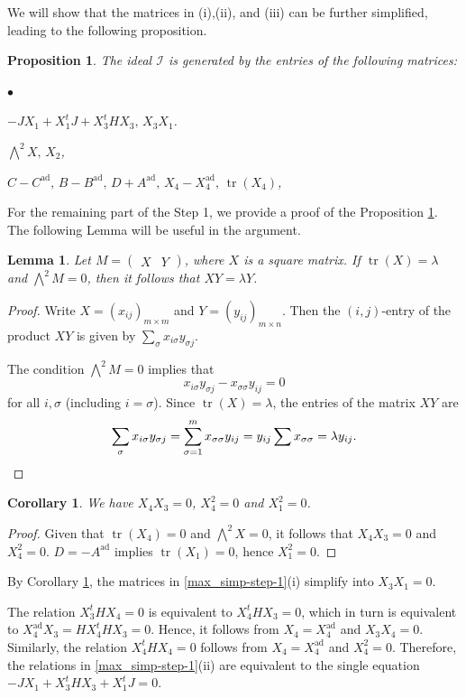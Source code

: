 \documentclass[pdflatex,sn-mathphys-num]{sn-jnl}%
\theoremstyle{thmstyleone}%
\newtheorem{proposition}[subsubsection]{Proposition}%
\newtheorem{lemma}[subsubsection]{Lemma}%
\newtheorem{corollary}[subsubsection]{Corollary}%
\theoremstyle{thmstyletwo}%
\numberwithin{equation}{subsection}
\theoremstyle{thmstylethree}%
\newcommand{\CI}{\ensuremath{\mathcal{I}}\xspace}
\newcommand{\ad}{\mathrm{ad}}
\DeclareMathOperator{\tr}{tr}
\newenvironment{altitemize}
	{\begin{list}
			{$\bullet$}
			{\setlength{\labelwidth}{0pt}
				\setlength{\itemindent}{5pt}
				\setlength{\labelsep}{5pt}
				\setlength{\leftmargin}{0pt}
				\setlength{\itemsep}{\the\smallskipamount}
		}}
		{\end{list}}
\begin{document}
We will show that the matrices in (i),(ii), and (iii) can be further simplified, leading to the following proposition.
\begin{proposition}\label{max_simp:step1}
The ideal $\CI$ is generated by the entries of the following matrices:
\begin{altitemize}
	\item $-JX_1+X_1^tJ+X_3^tHX_3,\, X_3X_1$.
	\item $\bigwedge^2 X,\, X_2$,
	\item $C-C^{\ad},\, B-B^{\ad},\, D+A^{\ad},\, X_4-X_4^{\ad},\, \tr(X_4)$,
\end{altitemize}
\end{proposition}
For the remaining part of the Step 1, we provide a proof of the Proposition \ref{max_simp:step1}. The following Lemma will be useful in the argument.
\begin{lemma}
Let $M=\left(\begin{matrix} X&Y\end{matrix}\right)$, where $X$ is a square matrix.
If 
 $\tr(X)=\lambda$ and $\bigwedge^2 M=0$, then it follows that $XY=\lambda Y$.   
\end{lemma}
\begin{proof}
Write $X=(x_{ij})_{m\times m}$ and $Y=(y_{ij})_{m\times n}$.
Then the $(i,j)$-entry of the product $XY$ is given by $\sum_\sigma x_{i\sigma}y_{\sigma j}$.
			
The condition $\bigwedge^2 M=0$ implies that 
$$x_{i\sigma }y_{\sigma j}-x_{\sigma\sigma}y_{ij}=0$$
for all $i,\sigma$ (including $i=\sigma$).
Since $\tr(X)=\lambda$, the entries of the matrix $XY$ are
\begin{equation*}
	\sum_\sigma x_{i\sigma}y_{\sigma j}=\sum_{\sigma=1}^m x_{\sigma \sigma}y_{ij}=y_{ij}\sum x_{\sigma\sigma}=\lambda y_{ij}.\qedhere
\end{equation*}
\end{proof}
		
		
\begin{corollary}\label{max_simp:zeros}
	We have $X_4X_3=0$, $X_4^2=0$ and $X_1^2=0$.
\end{corollary}  
\begin{proof}
Given that $\tr(X_4)=0$ and $\bigwedge^2 X=0$, it follows that $X_4X_3=0$ and $X_4^2=0$.
$D=-A^{\ad}$ implies $\tr(X_1)=0$, hence $X_1^2=0$.
\end{proof}
By Corollary \ref{max_simp:zeros}, the matrices in \eqref{max_simp-step-1}(i) simplify into $X_3X_1=0$.
		
The relation $X_3^tHX_4=0$ is equivalent to $X_4^tHX_3=0$, which in turn is equivalent to $X_4^{\ad}X_3=HX_4^tHX_3=0$.
Hence, it follows from $X_4=X_4^{\ad}$ and $X_3X_4=0$.
Similarly, the relation $X_4^tHX_4=0$ follows from $X_4=X_4^{\ad}$ and $X_4^2=0$.
Therefore, the relations in \eqref{max_simp-step-1}(ii) are equivalent to the single equation $-JX_1+X_3^tHX_3+X_1^tJ=0$.
		
\end{document}
